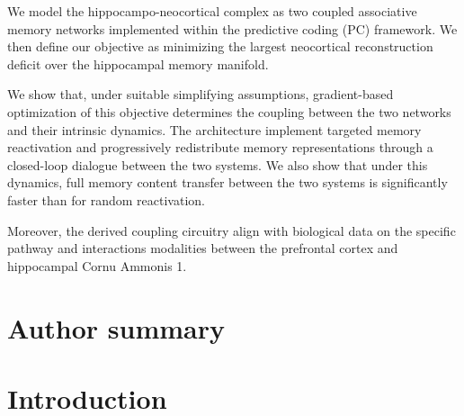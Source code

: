 \documentclass[10pt,letterpaper]{article}
\theoremstyle{plain}
\theoremstyle{remark}
\begin{document}
We model the hippocampo-neocortical complex as two coupled associative memory networks implemented within the predictive coding (PC) framework. We then define our objective as minimizing the largest neocortical reconstruction deficit over the hippocampal memory manifold.

We show that, under suitable simplifying assumptions, gradient-based optimization of this objective determines the coupling between the two networks and their intrinsic dynamics. The architecture implement targeted memory reactivation and progressively redistribute memory representations through a closed-loop dialogue between the two systems. We also show that under this dynamics, full memory content transfer between the two systems is significantly faster than for random reactivation. 

Moreover, the derived coupling circuitry align with biological data on the specific pathway and interactions modalities between the prefrontal cortex and hippocampal Cornu Ammonis 1.

\section*{Author summary}


\linenumbers

\newpage
\section{Introduction}

\end{document}
